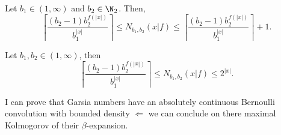 \begin{theorem}
    Let $b_1 \in (1,\infty)$ and $b_2 \in \N_2$. Then,
    \begin{equation}
       \left\lceil\frac{(b_2-1)b_2^{f(|x|)}}{b_1^{{|x|}}}\right\rceil \leq N_{b_1,b_2}(x|f) \leq \left\lceil\frac{(b_2-1)b_2^{f(|x|)}}{b_1^{{|x|}}}\right\rceil +1.
    \end{equation}
\end{theorem}

\begin{theorem}
    Let $b_1,b_2 \in (1,\infty)$, then 
    \begin{equation}
        \left\lceil\frac{(b_2-1)b_2^{f(|x|)}}{b_1^{{|x|}}}\right\rceil \leq N_{b_1,b_2}(x|f) \leq 2^{|x|}.
     \end{equation}
\end{theorem}


I can prove that Garsia numbers have an absolutely continuous Bernoulli convolution with bounded density $\Leftarrow$ we can conclude on there maximal Kolmogorov of their $\beta$-expansion. 




